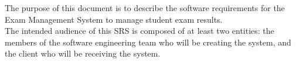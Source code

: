 The purpose of this document is to describe the software requirements for the Exam Management System to manage student exam results.
\\
The intended audience of this SRS is composed of at least two entities: the members of the software engineering team who will be creating the system, and the client who will be receiving the system.